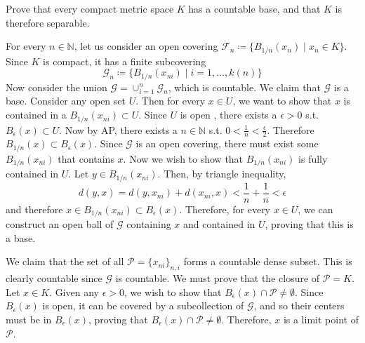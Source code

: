 \documentclass{article}
\begin{document}
    \begin{exercise}[Rudin 2.25]
    Prove that every compact metric space $K$ has a countable base, and that $K$ is therefore separable. 
    \end{exercise}
    \begin{solution}
    For every $n \in \mathbb{N}$, let us consider an open covering $\mathscr{F}_n \coloneqq \{B_{1/n} (x_n) \mid x_n \in K\}$. Since $K$ is compact, it has a finite subcovering 
    \[\mathscr{G}_n \coloneqq \{B_{1/n} (x_{ni}) \mid i = 1, \ldots, k(n)\}\]
    Now consider the union $\mathscr{G} = \cup_{i=1}^n \mathscr{G}_n$, which is countable. We claim that $\mathscr{G}$ is a base. Consider any open set $U$. Then for every $x \in U$, we want to show that $x$ is contained in a $B_{1/n} (x_{ni}) \subset U$. Since $U$ is open , there exists a $\epsilon > 0$ s.t. $B_\epsilon (x) \subset U$. Now by AP, there exists a $n \in \mathbb{N}$ s.t. $0 < \frac{1}{n} < \frac{\epsilon}{2}$. Therefore $B_{1/n} (x) \subset B_{\epsilon} (x)$. Since $\mathscr{G}$ is an open covering, there must exist some $B_{1/n} (x_{ni})$ that contains $x$. Now we wish to show that $B_{1/n} (x_{ni})$ is fully contained in $U$. Let $y \in B_{1/n} (x_{ni})$. Then, by triangle inequality, 
    \[d(y, x) = d(y, x_{ni}) + d(x_{ni}, x) < \frac{1}{n} + \frac{1}{n} < \epsilon\]
    and therefore $x \in B_{1/n} (x_{ni}) \subset B_{\epsilon} (x)$. Therefore, for every $x \in U$, we can construct an open ball of $\mathscr{G}$ containing $x$ and contained in $U$, proving that this is a base. 

    We claim that the set of all $\mathscr{P} = \{x_{ni}\}_{n, i}$ forms a countable dense subset. This is clearly countable since $\mathscr{G}$ is countable. We must prove that the closure of $\mathscr{P} = K$. Let $x \in K$. Given any $\epsilon > 0$, we wish to show that $B_{\epsilon} (x) \cap \mathscr{P} \neq \emptyset$. Since $B_\epsilon (x)$ is open, it can be covered by a subcollection of $\mathscr{G}$, and so their centers must be in $B_\epsilon (x)$, proving that $B_{\epsilon} (x) \cap \mathscr{P} \neq \emptyset$. Therefore, $x$ is a limit point of $\mathscr{P}$. 
    \end{solution}

    \begin{exercise}[Rudin 2.26]

    \end{exercise}

    \begin{exercise}[Rudin 2.27]

    \end{exercise}
\end{document}
